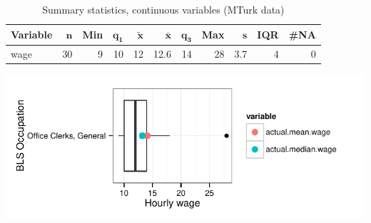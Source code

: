 \documentclass[a4paper,10pt]{article}\usepackage[]{graphicx}\usepackage[]{color}
\makeatletter
\def\maxwidth{ %
  \ifdim\Gin@nat@width>\linewidth
    \linewidth
  \else
    \Gin@nat@width
  \fi
}
\makeatother
\begin{document}
\begin{table}[ht]
\centering
{\footnotesize
\begin{tabular}{lrrrrrrrrrr}
 \textbf{Variable} & $\mathbf{n}$ & \textbf{Min} & $\mathbf{q_1}$ & $\mathbf{\widetilde{x}}$ & $\mathbf{\bar{x}}$ & $\mathbf{q_3}$ & \textbf{Max} & $\mathbf{s}$ & \textbf{IQR} & \textbf{\#NA} \\ 
  \hline
wage & 30 & 9 & 10 & 12 & 12.6 & 14 & 28 & 3.7 & 4 & 0 \\ 
  \end{tabular}
}
\caption{Summary statistics, continuous variables (MTurk data)} 
\label{tab2:43-9060}
\end{table}


{\centering \includegraphics[width=\maxwidth]{figure/unnamed-chunk-27} 

}
\end{document}
